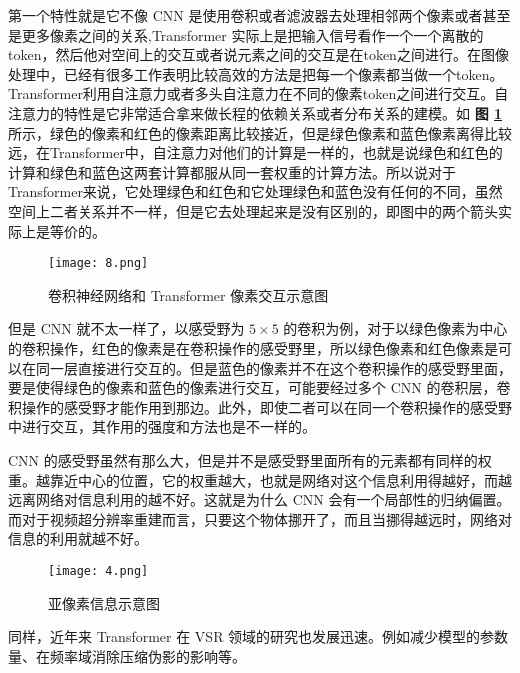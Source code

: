 第一个特性就是它不像 CNN 是使用卷积或者滤波器去处理相邻两个像素或者甚至是更多像素之间的关系,Transformer 实际上是把输入信号看作一个一个离散的 token，然后他对空间上的交互或者说元素之间的交互是在token之间进行。在图像处理中，已经有很多工作表明比较高效的方法是把每一个像素都当做一个token。Transformer利用自注意力或者多头自注意力在不同的像素token之间进行交互。自注意力的特性是它非常适合拿来做长程的依赖关系或者分布关系的建模。如 \textbf{图 \ref{fig:fig8}} 所示，绿色的像素和红色的像素距离比较接近，但是绿色像素和蓝色像素离得比较远，在Transformer中，自注意力对他们的计算是一样的，也就是说绿色和红色的计算和绿色和蓝色这两套计算都服从同一套权重的计算方法。所以说对于Transformer来说，它处理绿色和红色和它处理绿色和蓝色没有任何的不同，虽然空间上二者关系并不一样，但是它去处理起来是没有区别的，即图中的两个箭头实际上是等价的。

\begin{figure}[!htbp]
\centering
\texttt{[image: 8.png]}	
\caption{卷积神经网络和 Transformer 像素交互示意图}
\label{fig:fig8}
\end{figure}

但是 CNN 就不太一样了，以感受野为 $5 \times 5$ 的卷积为例，对于以绿色像素为中心的卷积操作，红色的像素是在卷积操作的感受野里，所以绿色像素和红色像素是可以在同一层直接进行交互的。但是蓝色的像素并不在这个卷积操作的感受野里面，要是使得绿色的像素和蓝色的像素进行交互，可能要经过多个 CNN 的卷积层，卷积操作的感受野才能作用到那边。此外，即使二者可以在同一个卷积操作的感受野中进行交互，其作用的强度和方法也是不一样的。

CNN 的感受野虽然有那么大，但是并不是感受野里面所有的元素都有同样的权重。越靠近中心的位置，它的权重越大，也就是网络对这个信息利用得越好，而越远离网络对信息利用的越不好。这就是为什么 CNN 会有一个局部性的归纳偏置。而对于视频超分辨率重建而言，只要这个物体挪开了，而且当挪得越远时，网络对信息的利用就越不好。

\begin{figure*}[!hb]
	\centering
	\texttt{[image: 4.png]}
	\caption{亚像素信息示意图}
	\label{fig:fig3}
\end{figure*}

同样，近年来 Transformer 在 VSR 领域的研究也发展迅速。例如减少模型的参数量、在频率域消除压缩伪影的影响等。
